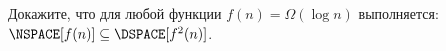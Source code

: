 Докажите, что для любой функции $f(n) = \Omega(\log n)$ выполняется:
$\NSPACE[f(n)] \subseteq \DSPACE[f^2(n)]$.